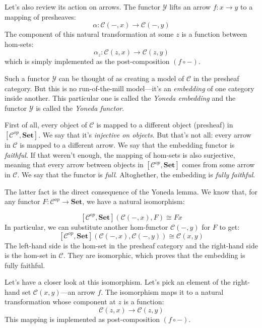 \documentclass[DaoFP]{subfiles}
\begin{document}
Let's also review its action on arrows. The functor $\mathcal{Y}$ lifts an arrow $f \colon x \to y$ to a mapping of presheaves:
\[ \alpha \colon \mathcal{C}(-, x) \to \mathcal{C}(-, y) \]
The component of this natural transformation at some $z$ is a function between hom-sets:
\[ \alpha_z \colon \mathcal{C}(z, x) \to \mathcal{C}(z, y) \]
which is simply implemented as the post-composition $(f \circ -)$.

Such a functor $\mathcal{Y}$ can be thought of as creating a model of $\mathcal{C}$ in the presheaf category. But this is no run-of-the-mill model---it's an \emph{embedding} of one category inside another. This particular one is called the \emph{Yoneda embedding} and the functor $\mathcal{Y}$ is called the \emph{Yoneda functor}. 

First of all, every object of $\mathcal{C}$ is mapped to a different object (presheaf) in $[\mathcal{C}^{op},  \mathbf{Set}]$. We say that it's \emph{injective on objects}. But that's not all: every arrow in $\mathcal{C}$ is mapped to a different arrow. We say that the embedding functor is \emph{faithful}. If that weren't enough, the mapping of hom-sets is also surjective, meaning that every arrow between objects in $[\mathcal{C}^{op},  \mathbf{Set}]$ comes from some arrow in $\mathcal{C}$. We say that the functor is \emph{full}. Altoghether, the embedding is \emph{fully faithful}.

The latter fact is the direct consequence of the Yoneda lemma. We know that, for any functor $F \colon \mathcal{C}^{op} \to \mathbf{Set}$, we have a natural isomorphism:

\[ [\mathcal{C}^{op}, \mathbf{Set}]( \mathcal{C}(-, x), F) \cong F x \]
In particular, we can substitute another hom-functor $\mathcal{C}(-, y)$ for $F$ to get:
\[ [\mathcal{C}^{op}, \mathbf{Set}]( \mathcal{C}(-, x), \mathcal{C}(-, y)) \cong \mathcal{C}(x, y)\]
The left-hand side is the hom-set in the presheaf category and the right-hand side is the hom-set in $\mathcal{C}$. They are isomorphic, which proves that the embedding is fully faithful.

Let's have a closer look at this isomorphism. Let's pick an element of the right-hand set $\mathcal{C}(x, y)$---an arrow $f$. The isomorphism maps it to a natural transformation whose component at $z$ is a function:
\[ \mathcal{C}(z, x) \to \mathcal{C}(z, y) \]
This mapping is implemented as post-composition $(f \circ -)$.
\end{document}
